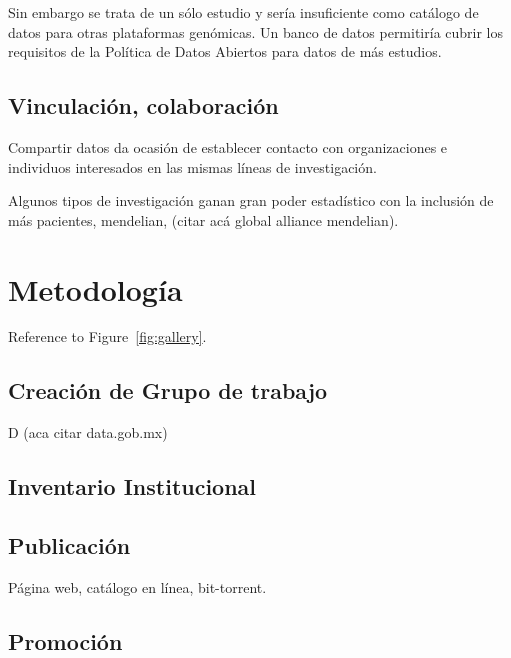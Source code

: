 \documentclass[
10pt, %
letterpaper, %
oneside, %
headinclude,footinclude, %
BCOR5mm, %
]{scrartcl}
\begin{document}
Sin embargo se trata de un sólo estudio y sería insuficiente como
catálogo de datos para otras plataformas genómicas. Un banco de datos
permitiría cubrir los requisitos de la Política de Datos Abiertos para
datos de más estudios.


\subsection{Vinculación, colaboración}
Compartir datos da ocasión de establecer contacto con organizaciones e
individuos interesados en las mismas líneas de investigación.

Algunos tipos de investigación ganan gran poder estadístico con la
inclusión de más pacientes, mendelian, (citar acá global alliance
mendelian). 


\section{Metodología}
Reference to Figure~\vref{fig:gallery}. %



\subsection{Creación de Grupo de trabajo}
D
(aca citar data.gob.mx)

\subsection{Inventario Institucional}
\cite{_nih_????}

\subsection{Publicación}
Página web, catálogo en línea, bit-torrent.

\subsection{Promoción}
\cite{schofield_post-publication_2009}
\end{document}
